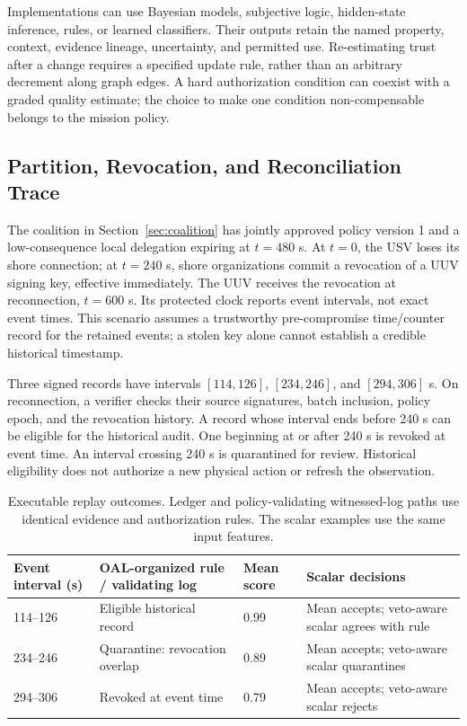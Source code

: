 Implementations can use Bayesian models, subjective logic, hidden-state inference, rules, or learned classifiers. Their outputs retain the named property, context, evidence lineage, uncertainty, and permitted use. Re-estimating trust after a change requires a specified update rule, rather than an arbitrary decrement along graph edges. A hard authorization condition can coexist with a graded quality estimate; the choice to make one condition non-compensable belongs to the mission policy.

\subsection{Partition, Revocation, and Reconciliation Trace}\label{sec:trace}

The coalition in Section~\ref{sec:coalition} has jointly approved policy version 1 and a low-consequence local delegation expiring at $t=480$ s. At $t=0$, the USV loses its shore connection; at $t=240$ s, shore organizations commit a revocation of a UUV signing key, effective immediately. The UUV receives the revocation at reconnection, $t=600$ s. Its protected clock reports event intervals, not exact event times. This scenario assumes a trustworthy pre-compromise time/counter record for the retained events; a stolen key alone cannot establish a credible historical timestamp.

Three signed records have intervals $[114,126]$, $[234,246]$, and $[294,306]$ s. On reconnection, a verifier checks their source signatures, batch inclusion, policy epoch, and the revocation history. A record whose interval ends before 240 s can be eligible for the historical audit. One beginning at or after 240 s is revoked at event time. An interval crossing 240 s is quarantined for review. Historical eligibility does not authorize a new physical action or refresh the observation.

\begin{table}[!htb]
\caption{Executable replay outcomes. Ledger and policy-validating witnessed-log paths use identical evidence and authorization rules. The scalar examples use the same input features.\label{tab:trace}}
\begin{tabularx}{\textwidth}{@{}P{23mm}YP{22mm}Y@{}}
\toprule
\textbf{Event interval (s)} & \textbf{OAL-organized rule / validating log} & \textbf{Mean score} & \textbf{Scalar decisions}\\
--126 & Eligible historical record & 0.99 & Mean accepts; veto-aware scalar agrees with rule\\
234--246 & Quarantine: revocation overlap & 0.89 & Mean accepts; veto-aware scalar quarantines\\
294--306 & Revoked at event time & 0.79 & Mean accepts; veto-aware scalar rejects\\
\bottomrule
\end{tabularx}
\end{table}

